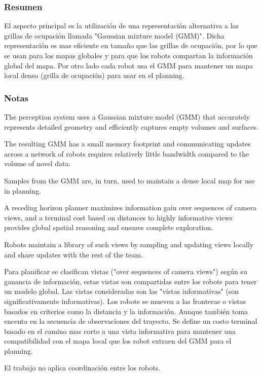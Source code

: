 \subsubsection{Resumen}
El aspecto principal es la utilización de una representación alternativa a las grillas de ocupación llamada "Gaussian mixture model (GMM)". Dicha representación es mas eficiente en tamaño que las grillas de ocupación, por lo que se usan para los mapas globales y para que los robots compartan la información global del mapa. Por otro lado cada robot usa el GMM para mantener un mapa local denso (grilla de ocupación) para usar en el planning. 

\subsubsection{Notas}

The perception system uses a Gaussian mixture model (GMM) that accurately represents detailed geometry and efficiently captures empty volumes and surfaces. 

The resulting GMM has a small memory footprint and communicating updates across a network of robots requires relatively little bandwidth compared to the volume of novel data.

Samples from the GMM are, in turn, used to maintain a dense local map for use in planning.

A receding horizon planner maximizes information gain over sequences of camera views, and a terminal cost based on distances to highly informative views provides global spatial reasoning and ensures complete exploration.

Robots maintain a library of such views by sampling and updating views locally and share updates with the rest of the team. 

Para planificar se clasifican vistas ("over sequences of camera views") según su ganancia de información, estas vistas son compartidas entre los robots para tener un modelo global. Las vistas consideradas son las "vistas informativas" (son significativamente informativas).
Los robots se mueven a las fronteras o vistas basados en criterios como la distancia y la información. Aunque también toma encenta en la secuencia de observaciones del trayecto.
Se define un costo terminal basado en el camino mas corto a una vista informativa para mantener una compatibilidad con el mapa local que los robot extraen del GMM para el planning.

El trabajo no aplica coordinación entre los robots.

